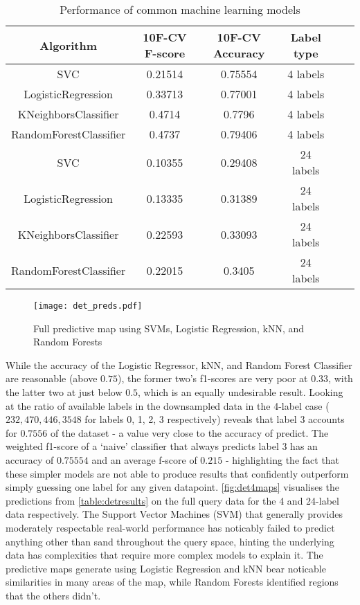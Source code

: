 \begin{table}
    \centering
\begin{tabular}{|c|c|c|c|c|c|}
    \hline
    Algorithm & 10F-CV F-score & 10F-CV Accuracy & Label type\\\hline
    SVC & 0.21514 & 0.75554 & 4 labels \\
    LogisticRegression & 0.33713 & 0.77001 & 4 labels \\
    KNeighborsClassifier & 0.4714 & 0.7796 & 4 labels \\
    RandomForestClassifier & 0.4737 & 0.79406 & 4 labels \\
    SVC & 0.10355 & 0.29408 & 24 labels \\
    LogisticRegression & 0.13335 & 0.31389 & 24 labels \\
    KNeighborsClassifier & 0.22593 & 0.33093 & 24 labels \\
    RandomForestClassifier & 0.22015 & 0.3405 & 24 labels \\
    \hline
\end{tabular}
\label{table:detresults}
    \caption{Performance of common machine learning models}
\end{table}

\begin{figure}[H]
    \texttt{[image: det\_preds.pdf]}
    \caption{Full predictive map using SVMs, Logistic Regression, kNN, and Random Forests}
    \label{fig:det4maps}
\end{figure}

While the accuracy of the Logistic Regressor, kNN, and Random Forest Classifier are reasonable (above $0.75$), the former two's f1-scores are very poor at $0.33$, with the latter two at just below $0.5$, which is an equally undesirable result. Looking at the ratio of available labels in the downsampled data in the 4-label case ($232,  470,  446, 3548$ for labels 0, 1, 2, 3 respectively) reveals that label 3 accounts for $0.7556$ of the dataset - a value very close to the accuracy of predict. The weighted f1-score of a `naive' classifier that always predicts label 3 has an accuracy of  $0.75554$ and an average f-score of $0.215$ - highlighting the fact that these simpler models are not able to produce results that confidently outperform simply guessing one label for any given datapoint. \autoref{fig:det4maps} visualises the predictions from \autoref{table:detresults} on the full query data for the 4 and 24-label data respectively. The Support Vector Machines (SVM) that generally provides moderately respectable real-world performance has noticably failed to predict anything other than sand throughout the query space, hinting the underlying data has complexities that require more complex models to explain it. The predictive maps generate using Logistic Regression and kNN bear noticable similarities in many areas of the map, while Random Forests identified regions that the others didn't.

